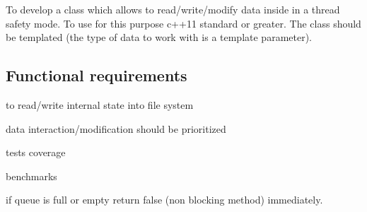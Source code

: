 To develop a class which allows to read/write/modify data inside in a thread safety mode. To use for this purpose c++11 standard or greater. The class should be templated (the type of data to work with is a template parameter).

\subsection*{Functional requirements}


\begin{DoxyItemize}
\item to read/write internal state into file system
\item data interaction/modification should be prioritized
\item tests coverage
\item benchmarks
\item if queue is full or empty return false (non blocking method) immediately. 
\end{DoxyItemize}